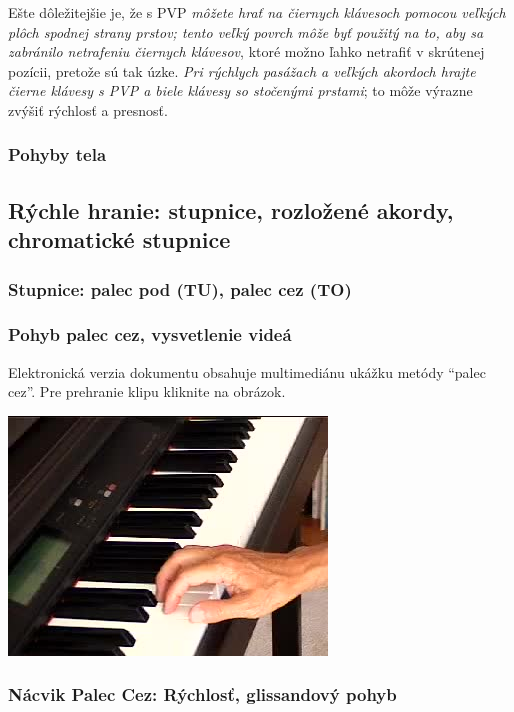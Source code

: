 Ešte dôležitejšie je, že s PVP \emph{môžete hrať na čiernych klávesoch pomocou veľkých plôch spodnej strany prstov; tento veľký povrch môže byť použitý na to, aby sa zabránilo netrafeniu čiernych klávesov}, ktoré možno ľahko netrafiť v skrútenej pozícii, pretože sú tak úzke. \emph{Pri rýchlych pasážach a veľkých akordoch hrajte čierne klávesy s PVP a biele klávesy so stočenými prstami}; to môže výrazne zvýšiť rýchlosť a presnosť.

\subsubsection{Pohyby tela}

\subsection{Rýchle hranie: stupnice, rozložené akordy, chromatické stupnice}

\subsubsection{Stupnice: palec pod (TU), palec cez (TO)}

\subsubsection{Pohyb palec cez, vysvetlenie videá}

Elektronická verzia dokumentu obsahuje multimediánu ukážku metódy “palec cez”. Pre prehranie klipu kliknite na obrázok.
\begin{center}
\includegraphics[height=0.4\linewidth]{TOscale.jpg}
\end{center}

\subsubsection{Nácvik Palec Cez: Rýchlosť, glissandový pohyb}

